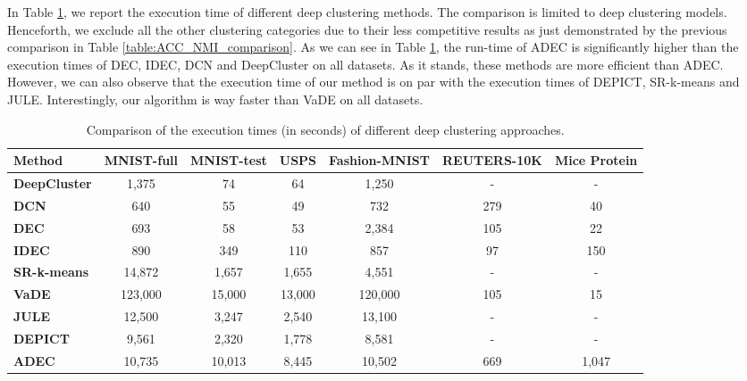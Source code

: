 \documentclass{article}
\begin{document}
In Table \ref{table:exec_time}, we report the execution time of different deep clustering methods. The comparison is limited to deep clustering models. Henceforth, we exclude all the other clustering categories due to their less competitive results as just demonstrated by the previous comparison in Table \ref{table:ACC_NMI_comparison}. As we can see in Table \ref{table:exec_time}, the run-time of ADEC is significantly higher than the execution times of DEC, IDEC, DCN and DeepCluster on all datasets. As it stands, these methods are more efficient than ADEC. However, we can also observe that the execution time of our method is on par with the execution times of DEPICT, SR-k-means and JULE. Interestingly, our algorithm is way faster than VaDE on all datasets. 

\begin{table}
  \caption{Comparison of the execution times (in seconds) of different deep clustering approaches.}
  \vskip 0.15in
  \begin{center}
  \begin{small}
  \begin{tabular}{|p{2.2cm}|c|c|c|c|c|c|}
    \hline
    {\textbf{Method}} & {\textbf{MNIST-full}} & {\textbf{MNIST-test}} & {\textbf{USPS}} &{\textbf{Fashion-MNIST}} & {\textbf{REUTERS-10K}}& {\textbf{Mice Protein}} \\ \hline
    \textbf{DeepCluster} & 1,375 & 74 & 64 & 1,250 & {-} & {-}\\ \hline
    \textbf{DCN} & 640 & 55 & 49 & 732 & 279 & 40 \\ \hline
    \textbf{DEC} & 693 & 58 & 53 & 2,384 & 105 & 22\\ \hline
    \textbf{IDEC} & 890 & 349 & 110 & 857 & 97 & 150\\ \hline
    \textbf{SR-k-means} & 14,872 & 1,657 & 1,655 & 4,551 & {-} & {-}\\ \hline
    \textbf{VaDE} & 123,000 & 15,000 & 13,000 & 120,000 & 105 & 15\\ \hline
    \textbf{JULE} & 12,500 & 3,247 & 2,540 & 13,100 & {-} & {-}\\ \hline
    \textbf{DEPICT} & 9,561 & 2,320 & 1,778 & 8,581 & {-} & {-} \\ \hline
    \textbf{ADEC} & 10,735 & 10,013 & 8,445 & 10,502 & 669  & 1,047 \\ \hline 
  \end{tabular}
  \label{table:exec_time}
  \end{small}
  \end{center}
  \vskip -0.1in
\end{table}
\end{document}
